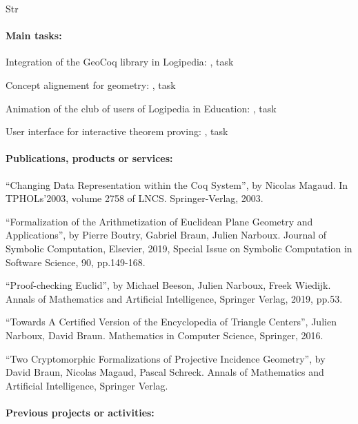 \begin{sitedescription}{Str}
\paragraph*{Main tasks:}

\begin{compactitem}
\item Integration of the GeoCoq library in Logipedia: , task 
\item Concept alignement for geometry: , task 
\item Animation of the club of users of Logipedia in Education: , task  
\item User interface for interactive theorem proving: , task 
\end{compactitem}

\paragraph*{Publications, products or services:}

\begin{compactitem}
\item ``Changing Data Representation within the Coq System'', by Nicolas Magaud. In TPHOLs'2003, volume 2758 of LNCS. Springer-Verlag, 2003.
\item ``Formalization of the Arithmetization of Euclidean Plane Geometry and Applications'', by Pierre Boutry, Gabriel Braun, Julien Narboux. Journal of Symbolic Computation, Elsevier, 2019, Special Issue on Symbolic Computation in Software Science, 90, pp.149-168.
\item ``Proof-checking Euclid'', by Michael Beeson, Julien Narboux, Freek Wiedijk. Annals of Mathematics and Artificial Intelligence, Springer Verlag, 2019, pp.53.
\item ``Towards A Certified Version of the Encyclopedia of Triangle Centers'', Julien Narboux, David Braun. Mathematics in Computer Science, Springer, 2016.
\item ``Two Cryptomorphic Formalizations of Projective Incidence Geometry'', by David Braun, Nicolas Magaud, Pascal Schreck. Annals of Mathematics and Artificial Intelligence, Springer Verlag.
\end{compactitem}

\paragraph*{Previous projects or activities:}


\end{sitedescription}
